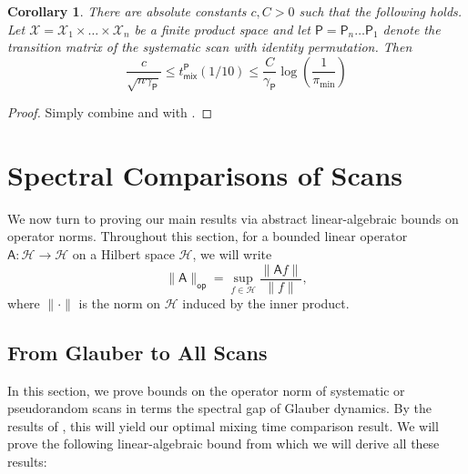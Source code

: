 \documentclass[11pt]{article}
\newtheorem{corollary}{Corollary}[section]
\begin{document}
\begin{corollary}
    There are absolute constants $c,C>0$ such that the following holds. Let $\mathcal{X}=\mathcal{X}_1\times\ldots\times \mathcal{X}_n$ be a finite product space and let $\mathsf{P}=\mathsf{P}_n\ldots \mathsf{P}_1$ denote the transition matrix of the systematic scan with identity permutation. Then
    \begin{equation*}
        \frac{c}{\sqrt{n\gamma_{\mathsf{P}}}}\leq t_{\mathsf{mix}}^{\mathsf{P}}(1/10)\leq \frac{C}{\gamma_{\mathsf{P}}} \log\left(\frac{1}{\pi_{\min}}\right)
    \end{equation*}
\end{corollary}
\begin{proof}
    Simply combine   and  with .
\end{proof}

\section{Spectral Comparisons of Scans}
\label{sec:proof}

We now turn to proving our main results via abstract linear-algebraic bounds on operator norms. Throughout this section, for a bounded linear operator $\mathsf{A}:\mathcal{H}\to \mathcal{H}$ on a Hilbert space $\mathcal{H}$, we will write
\begin{equation*}
    \|\mathsf{A}\|_{\mathsf{op}} =\sup_{f\in \mathcal{H}} \frac{\|\mathsf{A}f\|}{\|f\|},
\end{equation*}
where $\|\cdot\|$ is the norm on $\mathcal{H}$ induced by the inner product.

\subsection{From Glauber to All Scans}
In this section, we prove bounds on the operator norm of systematic or pseudorandom scans in terms the spectral gap of Glauber dynamics. By the results of , this will yield our optimal mixing time comparison result. We will prove the following linear-algebraic bound from which we will derive all these results:
\iffalse    
    
\end{document}
